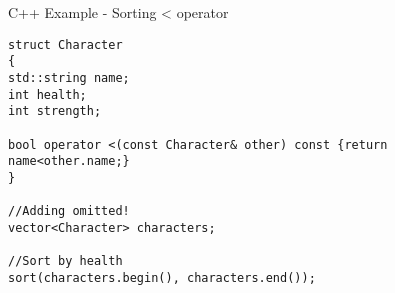 \begin{frame}[fragile]{C++ Example - Sorting < operator }
\begin{lstlisting}
struct Character
{
std::string name;
int health;
int strength;

bool operator <(const Character& other) const {return name<other.name;}
}

//Adding omitted!
vector<Character> characters;

//Sort by health
sort(characters.begin(), characters.end());
\end{lstlisting}
\end{frame}
